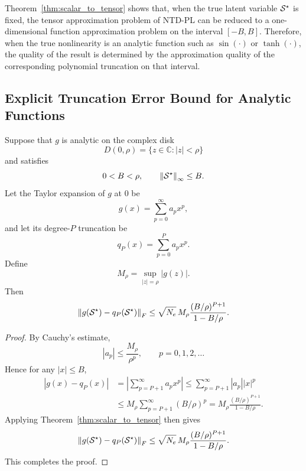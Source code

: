 \begin{remark}
Theorem~\ref{thm:scalar_to_tensor} shows that, when the true latent variable $\mathcal{S}^\star$ is fixed, the tensor approximation problem of NTD-PL can be reduced to a one-dimensional function approximation problem on the interval $[-B,B]$. Therefore, when the true nonlinearity is an analytic function such as $\sin(\cdot)$ or $\tanh(\cdot)$, the quality of the result is determined by the approximation quality of the corresponding polynomial truncation on that interval.
\end{remark}

\subsection{Explicit Truncation Error Bound for Analytic Functions}

\begin{theorem}
\label{thm:analytic_bound}
Suppose that $g$ is analytic on the complex disk
\begin{equation}
D(0,\rho)=\{z\in\mathbb{C}: |z|<\rho\}
\end{equation}
and satisfies
\begin{equation}
0<B<\rho,
\qquad
\left\lVert \mathcal{S}^\star \right\rVert_\infty\le B.
\end{equation}
Let the Taylor expansion of $g$ at $0$ be
\begin{equation}
g(x)=\sum_{p=0}^{\infty} a_p x^p,
\end{equation}
and let its degree-$P$ truncation be
\begin{equation}
q_P(x)=\sum_{p=0}^{P} a_p x^p.
\end{equation}
Define
\begin{equation}
M_\rho=\sup_{|z|=\rho}|g(z)|.
\end{equation}
Then
\begin{equation}
\left\lVert 
g(\mathcal{S}^\star)-q_P(\mathcal{S}^\star)
 \right\rVert_F
\le
\sqrt{N_e}\,M_\rho
\frac{(B/\rho)^{P+1}}{1-B/\rho}.
\label{eq:analytic_truncation_bound}
\end{equation}
\end{theorem}

\begin{proof}
By Cauchy's estimate,
\begin{equation}
|a_p|\le \frac{M_\rho}{\rho^p},\qquad p=0,1,2,\dots
\end{equation}
Hence for any $|x|\le B$,
\begin{align}
|g(x)-q_P(x)|
&=
\left|
\sum_{p=P+1}^{\infty} a_p x^p
\right|
\le
\sum_{p=P+1}^{\infty}|a_p||x|^p \\
&\le
M_\rho
\sum_{p=P+1}^{\infty}(B/\rho)^p
=
M_\rho \frac{(B/\rho)^{P+1}}{1-B/\rho}.
\end{align}
Applying Theorem~\ref{thm:scalar_to_tensor} then gives
\begin{equation}
\left\lVert 
g(\mathcal{S}^\star)-q_P(\mathcal{S}^\star)
 \right\rVert_F
\le
\sqrt{N_e}\,M_\rho
\frac{(B/\rho)^{P+1}}{1-B/\rho}.
\end{equation}
This completes the proof.
\end{proof}

